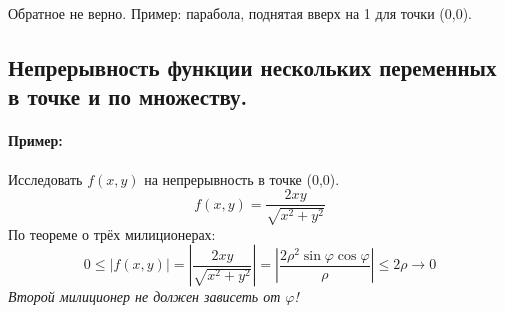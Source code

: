 \documentclass{article}
\newcommand{\ii}{\textit}
\begin{document}
Обратное не верно. Пример: парабола, поднятая вверх на 1 для точки (0,0).
\newpage
\subsection{Непрерывность функции нескольких переменных в точке и по множеству.}
\begin{figure}[h!]
    \centering
    \vspace{-1cm}
\end{figure}
\begin{figure}[h!]
    \centering
    \vspace{-1cm}
\end{figure}

\paragraph*{Пример:} Исследовать $f(x,y)$ на непрерывность в точке (0,0).
$$f(x,y) = \frac{2xy}{\sqrt{x^2+y^2}}$$
По теореме о трёх милиционерах:
$$0 \leq |f(x,y)| = \left| \frac{2xy}{\sqrt{x^2 + y^2}} \right| = \left| \frac{2 \rho^2 \sin\varphi \cos\varphi}{\rho} \right| \leq 2\rho \to 0$$
\ii{Второй милиционер не должен зависеть от $\varphi$!}
\newpage
\end{document}
